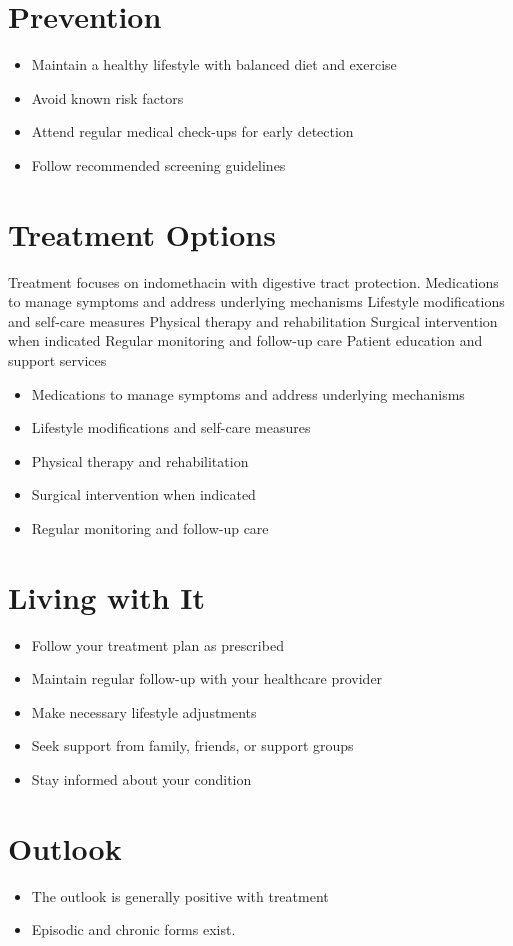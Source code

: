 \section{Prevention}
\begin{itemize}[noitemsep]
  \item Maintain a healthy lifestyle with balanced diet and exercise
  \item Avoid known risk factors
  \item Attend regular medical check-ups for early detection
  \item Follow recommended screening guidelines
\end{itemize}
\section{Treatment Options}
Treatment focuses on indomethacin with digestive tract protection. Medications to manage symptoms and address underlying mechanisms Lifestyle modifications and self-care measures Physical therapy and rehabilitation Surgical intervention when indicated Regular monitoring and follow-up care Patient education and support services

\begin{itemize}[noitemsep]
  \item Medications to manage symptoms and address underlying mechanisms
  \item Lifestyle modifications and self-care measures
  \item Physical therapy and rehabilitation
  \item Surgical intervention when indicated
  \item Regular monitoring and follow-up care
\end{itemize}
\section{Living with It}
\begin{itemize}[noitemsep]
  \item Follow your treatment plan as prescribed
  \item Maintain regular follow-up with your healthcare provider
  \item Make necessary lifestyle adjustments
  \item Seek support from family, friends, or support groups
  \item Stay informed about your condition
\end{itemize}
\section{Outlook}
\begin{itemize}[noitemsep]
  \item The outlook is generally positive with treatment
  \item Episodic and chronic forms exist.
\end{itemize}
